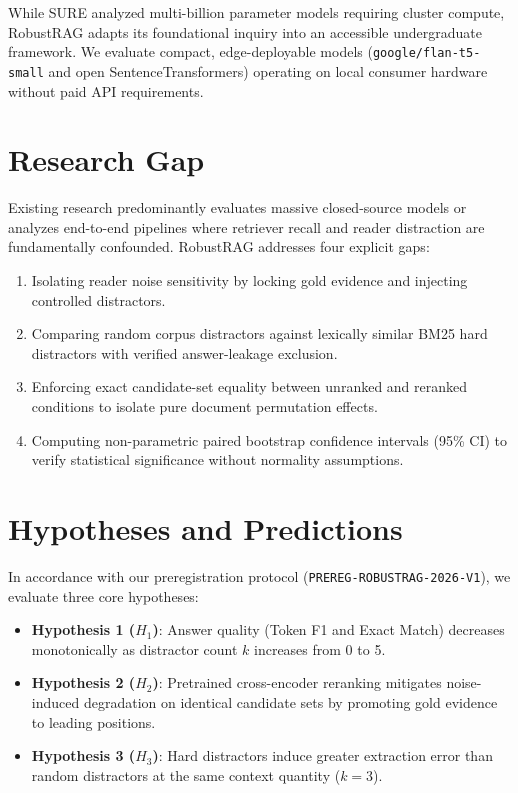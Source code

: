 \documentclass[conference]{IEEEtran}
\begin{document}
While SURE analyzed multi-billion parameter models requiring cluster compute, RobustRAG adapts its foundational inquiry into an accessible undergraduate framework. We evaluate compact, edge-deployable models (\texttt{google/flan-t5-small} and open SentenceTransformers) operating on local consumer hardware without paid API requirements.

\section{Research Gap}
Existing research predominantly evaluates massive closed-source models or analyzes end-to-end pipelines where retriever recall and reader distraction are fundamentally confounded. RobustRAG addresses four explicit gaps:
\begin{enumerate}
    \item Isolating reader noise sensitivity by locking gold evidence and injecting controlled distractors.
    \item Comparing random corpus distractors against lexically similar BM25 hard distractors with verified answer-leakage exclusion.
    \item Enforcing exact candidate-set equality between unranked and reranked conditions to isolate pure document permutation effects.
    \item Computing non-parametric paired bootstrap confidence intervals (95\% CI) to verify statistical significance without normality assumptions.
\end{enumerate}

\section{Hypotheses and Predictions}
In accordance with our preregistration protocol (\texttt{PREREG-ROBUSTRAG-2026-V1}), we evaluate three core hypotheses:
\begin{itemize}
    \item \textbf{Hypothesis 1 ($H_1$)}: Answer quality (Token F1 and Exact Match) decreases monotonically as distractor count $k$ increases from 0 to 5.
    \item \textbf{Hypothesis 2 ($H_2$)}: Pretrained cross-encoder reranking mitigates noise-induced degradation on identical candidate sets by promoting gold evidence to leading positions.
    \item \textbf{Hypothesis 3 ($H_3$)}: Hard distractors induce greater extraction error than random distractors at the same context quantity ($k=3$).
\end{itemize}
\end{document}
